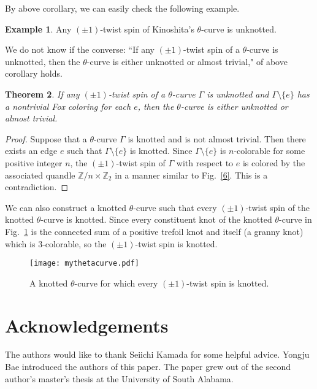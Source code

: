\documentclass{amsart}
\newcommand{\Z}{\mathbb{Z}}
\newtheorem{theorem}{Theorem}[section]
\theoremstyle{definition}
\newtheorem{example}[theorem]{Example}
\theoremstyle{remark}
\numberwithin{equation}{section}
\begin{document}
By above corollary, we can easily check the following example.

\begin{example}
Any $(\pm1)$-twist spin of Kinoshita's $\theta$-curve is unknotted.
\end{example}

We do not know if the converse: 
 ``If any $(\pm1)$-twist spin of a $\theta$-curve is unknotted, then the $\theta$-curve is either unknotted or almost trivial," of above corollary holds. 
 
\begin{theorem}
If any $(\pm1)$-twist spin of a $\theta$-curve $\Gamma$ is unknotted and $\Gamma \setminus \{e\}$ has a nontrivial Fox coloring for each $e$, then the $\theta$-curve is either unknotted or almost trivial.
\end{theorem}

\begin{proof}
Suppose that a $\theta$-curve $\Gamma$ is knotted and is not almost trivial. Then there exists an edge $e$ such that $\Gamma \setminus \{e\}$ is knotted. Since $\Gamma \setminus \{e\}$ is $n$-colorable for some positive integer $n$, the $(\pm1)$-twist spin of $\Gamma$ with respect to $e$ is colored by the associated quandle $\Z/n\times \mathbb{Z}_{2}$ in a manner similar to Fig.~\ref{6}. This is a contradiction.
\end{proof}

We can also construct a knotted $\theta$-curve such that every $(\pm1)$-twist spin of the knotted $\theta$-curve is knotted. Since every constituent knot of the knotted $\theta$-curve in Fig.~\ref{9} is the connected sum of a positive trefoil knot and itself (a granny knot) which is $3$-colorable, so the $(\pm1)$-twist spin is knotted.

\begin{figure}[h]
\texttt{[image: mythetacurve.pdf]}
\caption{A knotted $\theta$-curve for which every $(\pm1)$-twist spin is knotted.}
\label{9}
\end{figure}

\section*{Acknowledgements} The authors would like to thank Seiichi Kamada for some helpful advice. Yongju Bae introduced the authors of this paper. The paper grew out of the second author's master's thesis at the University of South Alabama.
\end{document}
